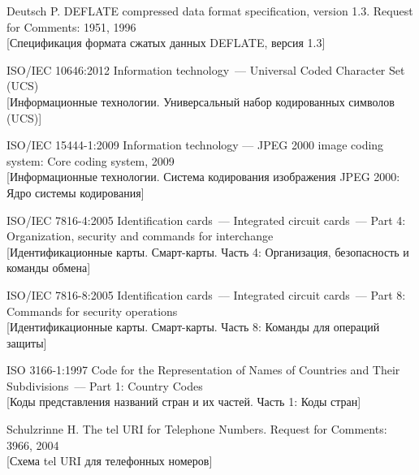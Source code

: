 \clearpage
\renewcommand{\bibname}{Библиография}
\begin{thebibliography}{9}

Deutsch P. DEFLATE compressed data format specification, version 1.3.
Request for Comments:  1951, 1996\\
{\small [Спецификация формата сжатых данных DEFLATE, версия 1.3]}

ISO/IEC 10646:2012 Information technology~--- Universal Coded Character 
Set (UCS)\\
{\small [Информационные технологии. Универсальный набор кодированных 
символов (UCS)]}

ISO/IEC 15444-1:2009 Information technology --- 
JPEG 2000 image coding system: Core coding system, 2009\\
{\small [Информационные технологии. Система кодирования изображения JPEG 
2000: Ядро системы кодирования]}

ISO/IEC 7816-4:2005 Identification cards~--- Integrated circuit cards~--- 
Part 4: Organization, security and commands for interchange\\
{\small [Идентификационные карты. Смарт-карты. 
Часть 4: Организация, безопасность и команды обмена]}

ISO/IEC 7816-8:2005 Identification cards~--– Integrated circuit cards~--- 
Part 8: Commands for security operations\\ 
{\small [Идентификационные карты. Смарт-карты. Часть 8: Команды для 
операций защиты]}

ISO 3166-1:1997 Code for the Representation of Names of Countries and 
Their Subdivisions~--– Part 1: Country Codes\\
{\small [Коды представления названий стран и их частей. Часть 1: Коды 
стран]}

Schulzrinne H. The tel URI for Telephone Numbers. Request for Comments:  3966, 2004\\ 
{\small [Схема tel URI для телефонных номеров]}

\label{LastBib}
\end{thebibliography}



